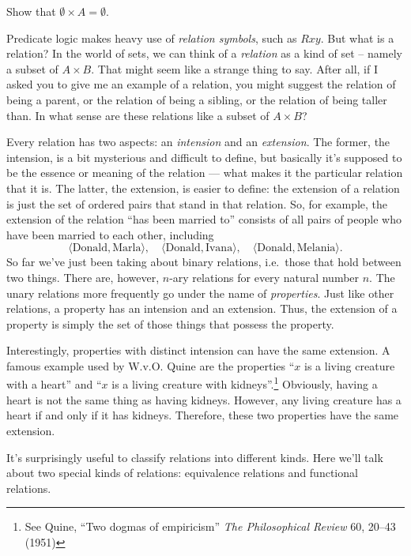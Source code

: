 \begin{exercise} Show that $\emptyset\times A=
  \emptyset$.  \end{exercise}


Predicate logic makes heavy use of \emph{relation symbols}, such as
$Rxy$.  But what is a relation?  In the world of sets, we can think of
a \emph{relation} as a kind of set -- namely a subset of $A\times B$.
That might seem like a strange thing to say.  After all, if I asked
you to give me an example of a relation, you might suggest the
relation of being a parent, or the relation of being a sibling, or the
relation of being taller than.  In what sense are these relations like
a subset of $A\times B$?

Every relation has two aspects: an \emph{intension} and an
\emph{extension}.  The former, the intension, is a bit mysterious and
difficult to define, but basically it's supposed to be the essence or
meaning of the relation --- what makes it the particular relation that
it is.  The latter, the extension, is easier to define: the extension
of a relation is just the set of ordered pairs that stand in that
relation.  So, for example, the extension of the relation ``has been
married to'' consists of all pairs of people who have been married to
each other, including
\[ \langle\text{Donald},\text{Marla}\rangle , \quad
  \langle\text{Donald},\text{Ivana}\rangle , \quad
  \langle\text{Donald},\text{Melania}\rangle . \] So far we've just
been taking about binary relations, i.e.\ those that hold between two
things.  There are, however, $n$-ary relations for every natural
number $n$.  The unary relations more frequently go under the name of
\emph{properties}.  Just like other relations, a property has an
intension and an extension.  Thus, the extension of a property is
simply the set of those things that possess the property.

Interestingly, properties with distinct intension can have the same
extension.  A famous example used by W.v.O. Quine are the properties
``$x$ is a living creature with a heart'' and ``$x$ is a living
creature with kidneys''.\footnote{See Quine, ``Two dogmas of
  empiricism'' {\it The Philosophical Review} 60, 20--43 (1951)}
Obviously, having a heart is not the same thing as having kidneys.
However, any living creature has a heart if and only if it has
kidneys.  Therefore, these two properties have the same extension.

It's surprisingly useful to classify relations into different kinds.
Here we'll talk about two special kinds of relations: equivalence
relations and functional relations.

